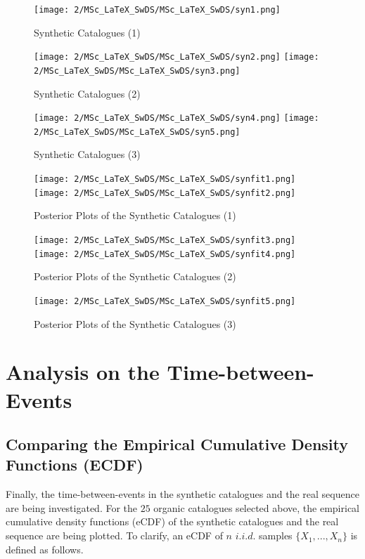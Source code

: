 \documentclass[11pt,twoside]{article}
\numberwithin{Theorem}{section}
\numberwithin{Definition}{section}
\numberwithin{Lemma}{section}
\numberwithin{Algorithm}{section}
\numberwithin{equation}{section}
\begin{document}
\begin{figure}[H]
\centering
\texttt{[image: 2/MSc\_LaTeX\_SwDS/MSc\_LaTeX\_SwDS/syn1.png]}
\caption{Synthetic Catalogues (1)}
\label{fig:syn1}
\end{figure}

\begin{figure}[H]
\centering
\texttt{[image: 2/MSc\_LaTeX\_SwDS/MSc\_LaTeX\_SwDS/syn2.png]}
\texttt{[image: 2/MSc\_LaTeX\_SwDS/MSc\_LaTeX\_SwDS/syn3.png]}
\caption{Synthetic Catalogues (2)}
\label{fig:syn2}
\end{figure}

\begin{figure}[H]
\centering
\texttt{[image: 2/MSc\_LaTeX\_SwDS/MSc\_LaTeX\_SwDS/syn4.png]}
\texttt{[image: 2/MSc\_LaTeX\_SwDS/MSc\_LaTeX\_SwDS/syn5.png]}
\caption{Synthetic Catalogues (3)}
\label{fig:syn3}
\end{figure}



\begin{figure}[H]
\centering
\texttt{[image: 2/MSc\_LaTeX\_SwDS/MSc\_LaTeX\_SwDS/synfit1.png]}
\texttt{[image: 2/MSc\_LaTeX\_SwDS/MSc\_LaTeX\_SwDS/synfit2.png]}
\caption{Posterior Plots of the Synthetic Catalogues (1)}
\label{fig:synfit1}
\end{figure}

\begin{figure}[H]
\centering
\texttt{[image: 2/MSc\_LaTeX\_SwDS/MSc\_LaTeX\_SwDS/synfit3.png]}
\texttt{[image: 2/MSc\_LaTeX\_SwDS/MSc\_LaTeX\_SwDS/synfit4.png]}
\caption{Posterior Plots of the Synthetic Catalogues (2)}
\label{fig:synfit2}
\end{figure}

\begin{figure}[H]
\centering
\texttt{[image: 2/MSc\_LaTeX\_SwDS/MSc\_LaTeX\_SwDS/synfit5.png]}
\caption{Posterior Plots of the Synthetic Catalogues (3)}
\label{fig:synfit3}
\end{figure}



\section{Analysis on the Time-between-Events}
\subsection{Comparing the Empirical Cumulative Density Functions (ECDF)}
Finally, the time-between-events in the synthetic catalogues and the real sequence are being investigated. For the $25$ organic catalogues selected above, the empirical cumulative density functions (eCDF) of the synthetic catalogues and the real sequence are being plotted. To clarify, an eCDF of $n$ $i.i.d.$ samples $\{X_1,...,X_n\}$ is defined as follows.
\end{document}
